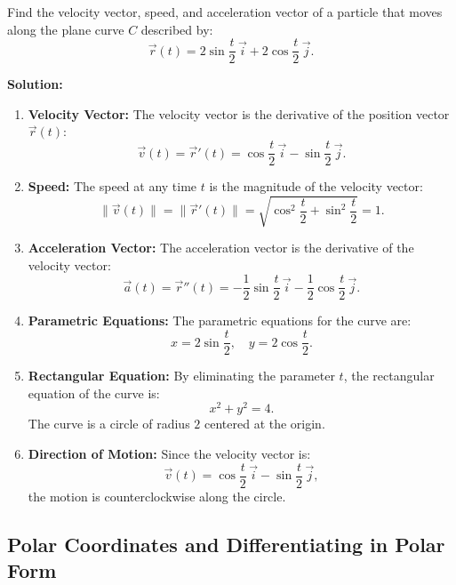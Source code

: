 \documentclass[12pt]{article}
\theoremstyle{beautifulthm}
\begin{document}
\begin{tcolorbox}[colback=examplebg, colframe=red!75!black, title=\textbf{EXAMPLE 2: Velocity and Acceleration Along a Plane Curve}, fonttitle=\bfseries, sharp corners]
Find the velocity vector, speed, and acceleration vector of a particle that moves along the plane curve $C$ described by:
\[
\vec{r}(t) = 2 \sin \frac{t}{2} \, \vec{i} + 2 \cos \frac{t}{2} \, \vec{j}.
\]


\tcblower
\textbf{Solution:} 
\begin{enumerate}
    \item \textbf{Velocity Vector:}  
    The velocity vector is the derivative of the position vector $\vec{r}(t)$:
    \[
    \vec{v}(t) = \vec{r}'(t) = \cos \frac{t}{2} \, \vec{i} - \sin \frac{t}{2} \, \vec{j}.
    \]

    \item \textbf{Speed:}  
    The speed at any time $t$ is the magnitude of the velocity vector:
    \[
    \|\vec{v}(t)\| = \|\vec{r}'(t)\| = \sqrt{\cos^2 \frac{t}{2} + \sin^2 \frac{t}{2}} = 1.
    \]

    \item \textbf{Acceleration Vector:}  
    The acceleration vector is the derivative of the velocity vector:
    \[
    \vec{a}(t) = \vec{r}''(t) = -\frac{1}{2} \sin \frac{t}{2} \, \vec{i} - \frac{1}{2} \cos \frac{t}{2} \, \vec{j}.
    \]

    \item \textbf{Parametric Equations:}  
    The parametric equations for the curve are:
    \[
    x = 2 \sin \frac{t}{2}, \quad y = 2 \cos \frac{t}{2}.
    \]

    \item \textbf{Rectangular Equation:}  
    By eliminating the parameter $t$, the rectangular equation of the curve is:
    \[
    x^2 + y^2 = 4.
    \]
    The curve is a circle of radius $2$ centered at the origin.

    \item \textbf{Direction of Motion:}  
    Since the velocity vector is:
    \[
    \vec{v}(t) = \cos \frac{t}{2} \, \vec{i} - \sin \frac{t}{2} \, \vec{j},
    \]
    the motion is counterclockwise along the circle.
\end{enumerate}
\end{tcolorbox}


\subsection{ Polar Coordinates and
Differentiating in Polar Form}
\end{document}
